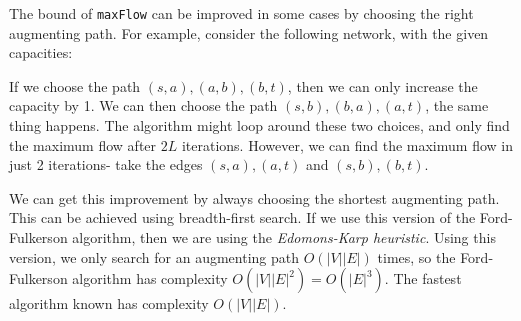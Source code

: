 \documentclass[a4paper, openany]{memoir}
\begin{document}
    The bound of \texttt{maxFlow} can be improved in some cases by choosing the right augmenting path. For example, consider the following network, with the given capacities:
    \begin{figure}[H]
        \centering
    \end{figure}
    \noindent If we choose the path $(s, a), (a, b), (b, t)$, then we can only increase the capacity by 1. We can then choose the path $(s, b), (b, a), (a, t)$, the same thing happens. The algorithm might loop around these two choices, and only find the maximum flow after $2L$ iterations. However, we can find the maximum flow in just 2 iterations- take the edges $(s, a), (a, t)$ and $(s, b), (b, t)$. 
    
    We can get this improvement by always choosing the shortest augmenting path. This can be achieved using breadth-first search. If we use this version of the Ford-Fulkerson algorithm, then we are using the \emph{Edomons-Karp heuristic}. Using this version, we only search for an augmenting path $O(|V||E|)$ times, so the Ford-Fulkerson algorithm has complexity $O(|V||E|^2) = O(|E|^3)$. The fastest algorithm known has complexity $O(|V||E|)$.

\end{document}

